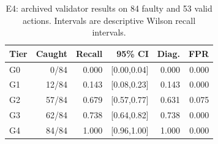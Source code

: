 \begin{table}[t]
\centering\footnotesize
\caption{E4: archived validator results on 84 faulty and 53 valid actions. Intervals are descriptive Wilson recall intervals.}
\label{tab:archive-guardrails}
\setlength{\tabcolsep}{3.5pt}
\begin{tabular}{@{}lrrrrr@{}}
\toprule
Tier & Caught & Recall & 95\% CI & Diag. & FPR \\
\midrule
G0 & 0/84 & 0.000 & [0.00,0.04] & 0.000 & 0.000 \\
G1 & 12/84 & 0.143 & [0.08,0.23] & 0.143 & 0.000 \\
G2 & 57/84 & 0.679 & [0.57,0.77] & 0.631 & 0.075 \\
G3 & 62/84 & 0.738 & [0.64,0.82] & 0.738 & 0.000 \\
G4 & 84/84 & 1.000 & [0.96,1.00] & 1.000 & 0.000 \\
\bottomrule
\end{tabular}
\end{table}
